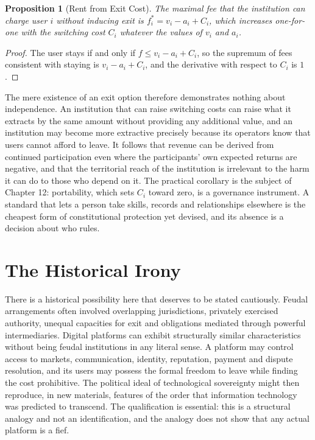 \documentclass[11pt,twoside,openany]{book}
\newtheorem{proposition}[theorem]{Proposition}
\theoremstyle{definition}
\theoremstyle{remark}
\begin{document}
\begin{proposition}[Rent from Exit Cost]\label{prop:rent}
The maximal fee that the institution can charge user $i$ without inducing exit is $f_i^{*}=v_i-a_i+C_i$, which increases one-for-one with the switching cost $C_i$ whatever the values of $v_i$ and $a_i$.
\end{proposition}
\begin{proof}
The user stays if and only if $f\le v_i-a_i+C_i$, so the supremum of fees consistent with staying is $v_i-a_i+C_i$, and the derivative with respect to $C_i$ is $1$.
\end{proof}

The mere existence of an exit option therefore demonstrates nothing about independence. An institution that can raise switching costs can raise what it extracts by the same amount without providing any additional value, and an institution may become more extractive precisely because its operators know that users cannot afford to leave. It follows that revenue can be derived from continued participation even where the participants' own expected returns are negative, and that the territorial reach of the institution is irrelevant to the harm it can do to those who depend on it. The practical corollary is the subject of Chapter 12: portability, which sets $C_i$ toward zero, is a governance instrument. A standard that lets a person take skills, records and relationships elsewhere is the cheapest form of constitutional protection yet devised, and its absence is a decision about who rules.

\section{The Historical Irony}

There is a historical possibility here that deserves to be stated cautiously. Feudal arrangements often involved overlapping jurisdictions, privately exercised authority, unequal capacities for exit and obligations mediated through powerful intermediaries. Digital platforms can exhibit structurally similar characteristics without being feudal institutions in any literal sense. A platform may control access to markets, communication, identity, reputation, payment and dispute resolution, and its users may possess the formal freedom to leave while finding the cost prohibitive. The political ideal of technological sovereignty might then reproduce, in new materials, features of the order that information technology was predicted to transcend. The qualification is essential: this is a structural analogy and not an identification, and the analogy does not show that any actual platform is a fief.
\end{document}
